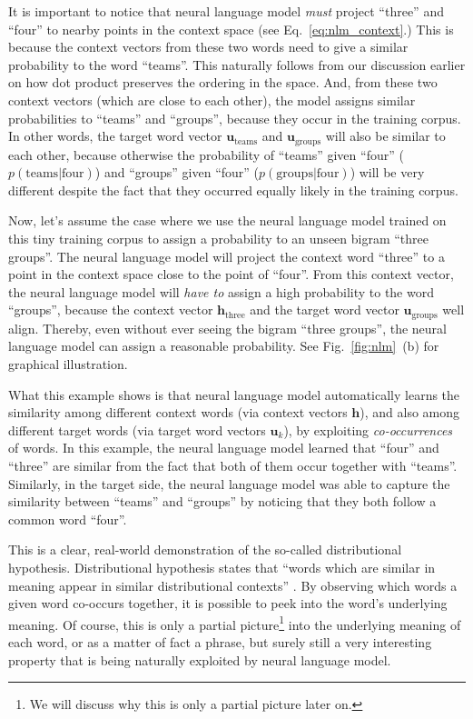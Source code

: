 \documentclass{report}
\newcommand{\vect}[1]{\mathbf{#1}}
\newcommand{\vh}[0]{\vect{h}}
\newcommand{\vu}[0]{\vect{u}}
\begin{document}
It is important to notice that neural language model {\em must} project
``three'' and ``four'' to nearby points in the context space (see
Eq.~\eqref{eq:nlm_context}.) This is because the context vectors from these two
words need to give a similar probability to the word ``teams''. This naturally
follows from our discussion earlier on how dot product preserves the ordering in
the space. And, from these two context vectors (which are close to each other),
the model assigns similar probabilities to ``teams'' and ``groups'', because
they occur in the training corpus. In other words, the target word vector
$\vu_{\text{teams}}$ and $\vu_{\text{groups}}$ will also be similar to each
other, because otherwise the probability of ``teams'' given ``four''
($p(\text{teams} | \text{four})$) and
``groups'' given ``four'' ($p(\text{groups} | \text{four})$) will be very
different despite the fact that they occurred equally likely in the training
corpus.

Now, let's assume the case where we use the neural language model trained on
this tiny training corpus to assign a probability to an unseen bigram ``three
groups''. The neural language model will project the context word ``three'' to a
point in the context space close to the point of ``four''. From this context
vector, the neural language model will {\em have to} assign a high probability
to the word ``groups'', because the context vector $\vh_{\text{three}}$ and the
target word vector $\vu_{\text{groups}}$ well align. Thereby, even without ever
seeing the bigram ``three groups'', the neural language model can assign a
reasonable probability. See Fig.~\ref{fig:nlm}~(b) for graphical
illustration.

What this example shows is that neural language model automatically learns the
similarity among different context words (via context vectors $\vh$), and also among
different target words (via target word vectors $\vu_k$), by exploiting {\em
co-occurrences} of words. In this example, the neural language model learned
that ``four'' and ``three'' are similar from the fact that both of them occur
together with ``teams''. Similarly, in the target side, the neural language
model was able to capture the similarity between ``teams'' and ``groups'' by
noticing that they both follow a common word ``four''.

This is a clear, real-world demonstration of the so-called distributional
hypothesis. Distributional hypothesis states that ``words which are similar in
meaning appear in similar distributional contexts'' \cite{firth1957}. By
observing which words a given word co-occurs together, it is possible to peek
into the word's underlying meaning. Of course, this is only a partial
picture\footnote{
    We will discuss why this is only a partial picture later on.
}
into the underlying meaning of each word, or as a matter of fact a phrase, but
surely still a very interesting property that is being naturally exploited by
neural language model.
\end{document}
